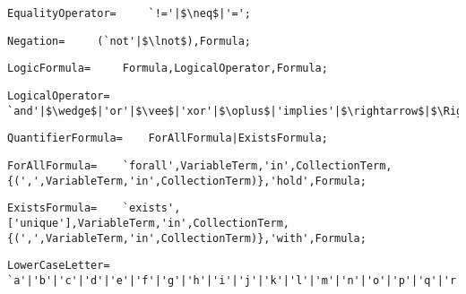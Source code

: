 \documentclass{article}
\begin{document}
    \begin{flushleft}
    \begin{lstlisting}[mathescape=true, breaklines=true]
      EqualityOperator= 	`!='|$\neq$|'=';
    \end{lstlisting}
    \end{flushleft}
    \begin{flushleft}
    \begin{lstlisting}[mathescape=true, breaklines=true]
      Negation= 	(`not'|$\lnot$),Formula;
    \end{lstlisting}
    \end{flushleft}
    \begin{flushleft}
    \begin{lstlisting}[mathescape=true, breaklines=true]
      LogicFormula= 	Formula,LogicalOperator,Formula;
    \end{lstlisting}
    \end{flushleft}
    \begin{flushleft}
    \begin{lstlisting}[mathescape=true, breaklines=true]
      LogicalOperator= 	`and'|$\wedge$|'or'|$\vee$|'xor'|$\oplus$|'implies'|$\rightarrow$|$\Rightarrow$|'iff'|$\leftrightarrow$|$\Leftrightarrow$;
    \end{lstlisting}
    \end{flushleft}
    \begin{flushleft}
    \begin{lstlisting}[mathescape=true, breaklines=true]
      QuantifierFormula= 	ForAllFormula|ExistsFormula;
    \end{lstlisting}
    \end{flushleft}
    \begin{flushleft}
    \begin{lstlisting}[mathescape=true, breaklines=true]
      ForAllFormula= 	`forall',VariableTerm,'in',CollectionTerm,{(',',VariableTerm,'in',CollectionTerm)},'hold',Formula;
    \end{lstlisting}
    \end{flushleft}
    \begin{flushleft}
    \begin{lstlisting}[mathescape=true, breaklines=true]
      ExistsFormula= 	`exists',['unique'],VariableTerm,'in',CollectionTerm,{(',',VariableTerm,'in',CollectionTerm)},'with',Formula;
    \end{lstlisting}
    \end{flushleft}
    \begin{flushleft}
    \begin{lstlisting}[mathescape=true, breaklines=true]
      LowerCaseLetter= 	`a'|'b'|'c'|'d'|'e'|'f'|'g'|'h'|'i'|'j'|'k'|'l'|'m'|'n'|'o'|'p'|'q'|'r'|'s'|'t'|'u'|'v'|'w'|'x'|'y'|'z';
    \end{lstlisting}
    \end{flushleft}
\end{document}
